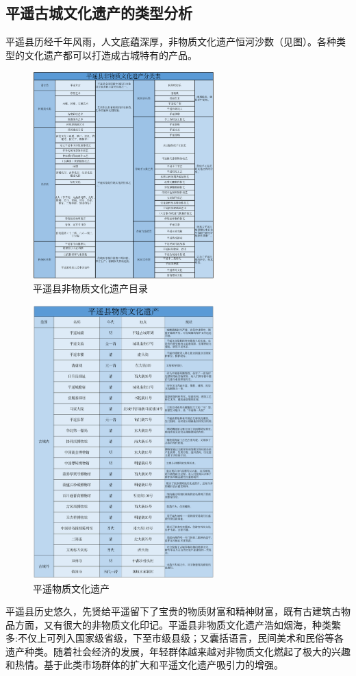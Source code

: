 \documentclass[UTF8]{ctexart}
\begin{document}
    \subsection{平遥古城文化遗产的类型分析}
    平遥县历经千年风雨，人文底蕴深厚，非物质文化遗产恒河沙数（见图）。各种类型的文化遗产都可以打造成古城特有的产品。
\begin{figure}[H]
    \centering
    \caption{平遥县非物质文化遗产目录}
    \includegraphics[width=7cm]{非物质文化遗产.png}
\end{figure}
\begin{figure}[H]
    \centering
    \caption{平遥物质文化遗产}
    \includegraphics[width=7cm]{物质文化遗产.png}
\end{figure}
平遥县历史悠久，先贤给平遥留下了宝贵的物质财富和精神财富，既有古建筑古物品方面，又有很大的非物质文化印记。平遥县非物质文化遗产浩如烟海，种类繁多:不仅上可列入国家级省级，下至市级县级；又囊括语言，民间美术和民俗等各遗产种类。随着社会经济的发展，年轻群体越来越对非物质文化燃起了极大的兴趣和热情。基于此类市场群体的扩大和平遥文化遗产吸引力的增强。
\end{document}
